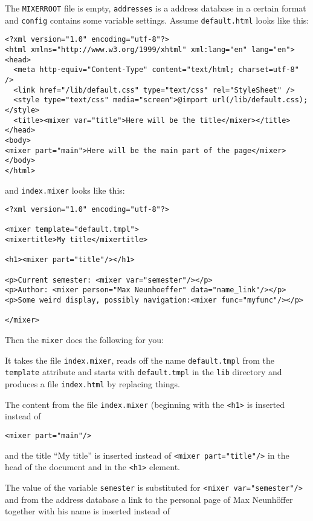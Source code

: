 \documentclass[a4paper,11pt]{article}
\newcommand{\mixer}{\texttt{mixer}}
\newcommand{\MIXERROOT}{\texttt{MIXERROOT}}
\begin{document}
The {\MIXERROOT} file is empty, \verb!addresses! is a address database
in a certain format and \verb!config! contains some variable settings.
Assume \verb!default.html! looks like this:

{\small
\begin{verbatim}
<?xml version="1.0" encoding="utf-8"?>
<html xmlns="http://www.w3.org/1999/xhtml" xml:lang="en" lang="en">
<head>
  <meta http-equiv="Content-Type" content="text/html; charset=utf-8" />
  <link href="/lib/default.css" type="text/css" rel="StyleSheet" />
  <style type="text/css" media="screen">@import url(/lib/default.css);</style>
  <title><mixer var="title">Here will be the title</mixer></title>
</head>
<body>
<mixer part="main">Here will be the main part of the page</mixer>
</body>
</html>
\end{verbatim}}

and \verb!index.mixer! looks like this:

\begin{verbatim}
<?xml version="1.0" encoding="utf-8"?>

<mixer template="default.tmpl"> 
<mixertitle>My title</mixertitle>

<h1><mixer part="title"/></h1>

<p>Current semester: <mixer var="semester"/></p>
<p>Author: <mixer person="Max Neunhoeffer" data="name_link"/></p>
<p>Some weird display, possibly navigation:<mixer func="myfunc"/></p>

</mixer>
\end{verbatim}

Then the {\mixer} does the following for you: 

It takes the file 
\verb!index.mixer!, reads off the name \verb!default.tmpl! from the
\verb!template! attribute and starts with \verb!default.tmpl! in the
\verb!lib! directory and produces a file \verb!index.html! by
replacing things.

The content from the file \verb!index.mixer! (beginning with the
\verb!<h1>! is inserted instead of 

\hspace*{5mm}\verb!<mixer part="main"/>!

and the title "`My title"' is inserted instead of \verb!<mixer part="title"/>!
in the head of the document and in the \verb!<h1>! element.

The value of the variable \verb!semester! is substituted for
\verb!<mixer var="semester"/>! and from the address database
a link to the personal page of Max Neunhöffer together with his
name is inserted instead of 
\end{document}
